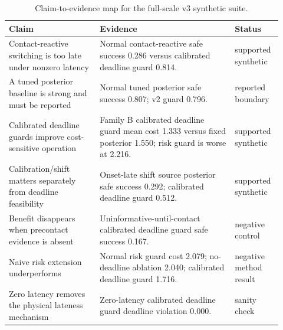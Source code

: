 \begin{table}[t]
\centering
\scriptsize
\caption{Claim-to-evidence map for the full-scale v3 synthetic suite.}
\label{tab:claim-evidence}
\begin{tabular}{p{0.31\linewidth}p{0.46\linewidth}p{0.15\linewidth}}
\toprule
Claim & Evidence & Status \\
\midrule
Contact-reactive switching is too late under nonzero latency & Normal contact-reactive safe success 0.286 versus calibrated deadline guard 0.814. & supported synthetic \\
A tuned posterior baseline is strong and must be reported & Normal tuned posterior safe success 0.807; v2 guard 0.796. & reported boundary \\
Calibrated deadline guards improve cost-sensitive operation & Family B calibrated deadline guard mean cost 1.333 versus fixed posterior 1.550; risk guard is worse at 2.216. & supported synthetic \\
Calibration/shift matters separately from deadline feasibility & Onset-late shift source posterior safe success 0.292; calibrated deadline guard 0.512. & supported synthetic \\
Benefit disappears when precontact evidence is absent & Uninformative-until-contact calibrated deadline guard safe success 0.167. & negative control \\
Naive risk extension underperforms & Normal risk guard cost 2.079; no-deadline ablation 2.040; calibrated deadline guard 1.716. & negative method result \\
Zero latency removes the physical lateness mechanism & Zero-latency calibrated deadline guard deadline violation 0.000. & sanity check \\
\bottomrule
\end{tabular}
\end{table}
